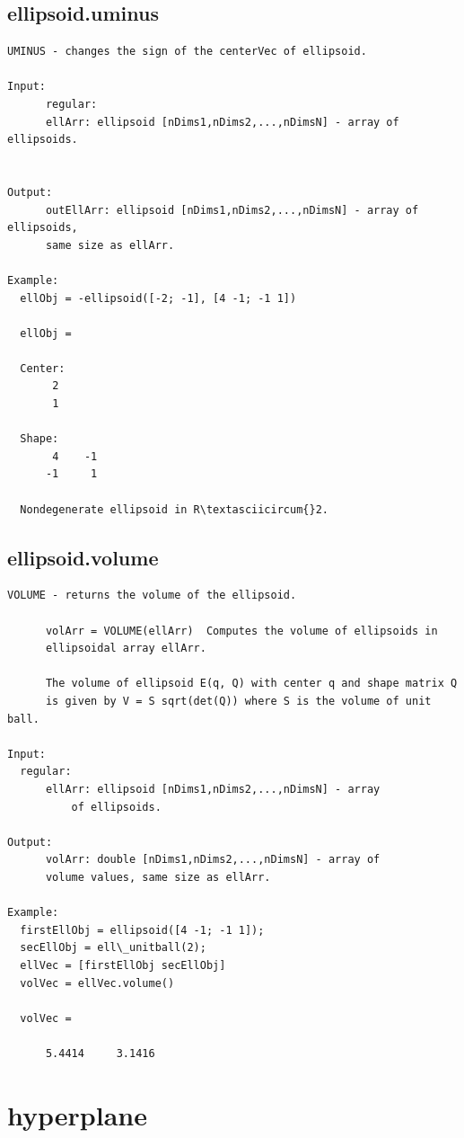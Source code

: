 \documentclass[letterpaper,10pt,english]{sphinxmanual}
\begin{document}
\subsection{ellipsoid.uminus}
\label{chap_functions:ellipsoid-uminus}
\begin{Verbatim}[commandchars=\\\{\}]
UMINUS - changes the sign of the centerVec of ellipsoid.

Input:
      regular:
      ellArr: ellipsoid [nDims1,nDims2,...,nDimsN] - array of ellipsoids.


Output:
      outEllArr: ellipsoid [nDims1,nDims2,...,nDimsN] - array of ellipsoids,
      same size as ellArr.

Example:
  ellObj = -ellipsoid([-2; -1], [4 -1; -1 1])

  ellObj =

  Center:
       2
       1

  Shape:
       4    -1
      -1     1

  Nondegenerate ellipsoid in R\textasciicircum{}2.
\end{Verbatim}


\subsection{ellipsoid.volume}
\label{chap_functions:ellipsoid-volume}
\begin{Verbatim}[commandchars=\\\{\}]
VOLUME - returns the volume of the ellipsoid.

      volArr = VOLUME(ellArr)  Computes the volume of ellipsoids in
      ellipsoidal array ellArr.

      The volume of ellipsoid E(q, Q) with center q and shape matrix Q
      is given by V = S sqrt(det(Q)) where S is the volume of unit ball.

Input:
  regular:
      ellArr: ellipsoid [nDims1,nDims2,...,nDimsN] - array
          of ellipsoids.

Output:
      volArr: double [nDims1,nDims2,...,nDimsN] - array of
      volume values, same size as ellArr.

Example:
  firstEllObj = ellipsoid([4 -1; -1 1]);
  secEllObj = ell\_unitball(2);
  ellVec = [firstEllObj secEllObj]
  volVec = ellVec.volume()

  volVec =

      5.4414     3.1416
\end{Verbatim}


\section{hyperplane}
\label{chap_functions:hyperplane}
\end{document}
